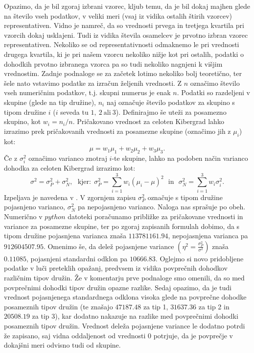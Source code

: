 \documentclass{article}
\begin{document}
Opazimo, da je bil zgoraj izbrani vzorec, kljub temu, da je bil dokaj majhen glede na število vseh podatkov, v veliki meri (vsaj iz vidika ostalih štirih vzorcev) representativen.
Vidno je namreč, da so vrednosti prvega in tretjega kvartila pri vzorcih dokaj usklajeni. 
Tudi iz vidika števila osamelcev je prvotno izbran vzorec representativen. 
Nekoliko se od representativnosti odmaknemo le pri vrednosti drugega kvartila, ki je pri našem vzorcu nekoliko nižje kot pri ostalih, podatki o dohodkih prvotno izbranega vzorca pa so tudi nekoliko nagnjeni k višjim vrednostim.
\newline
\newline
Zadnje podnaloge se za začetek lotimo nekoliko bolj teoretično, ter šele nato vstavimo podatke za izračun željenih vrednosti. 
Z $n$ označimo število vseh numeričnim podatkov, t.j. skupni numerus je enak $n$. Podatki so razdeljeni v skupine (glede na tip družine), $n_i$ naj označuje število podatkov za skupino s tipom družine $i$ ($i$ seveda tu $1,~2~\text{ali}~3$).
Definirajmo še uteži za posamezno skupino, kot $w_i = n_i/n$.
\newline
Pričakovano vrednost za celoten Kibergrad lahko izrazimo prek pričakovanih vrednosti za posamezne skupine (označimo jih z $\mu_i$) kot:
$$
    \mu = w_1 \mu_1 + w_2 \mu_2 + w_3 \mu_3.
$$
Če z $\sigma_{i}^2$ označimo varianco znotraj $i$-te skupine, lahko na podoben način varianco dohodka za celoten Kibergrad izrazimo kot:
$$
\sigma^2 = \sigma_{P}^2 + \sigma_{N}^2,~~~\text{kjer:}~~\sigma_{P}^2 = \sum_{i=1}^{3}{w_i(\mu_i - \mu)^2}~~~\text{in}~~~\sigma_{N}^2 = \sum_{i=1}^{3}{w_i \sigma_{i}^2}.
$$
Izpeljava je navedena v \cite{poj_nepo_var}. V zgornjem zapisu $\sigma_P^2$ označuje s tipom družine pojasnjeno varianco, $\sigma_N^2$ pa nepojasnjeno varianco. Naloga nas sprašuje po obeh. 
\newline
Numerično v $python$ datoteki poračunamo približke za pričakovane vrednosti in variance za posamezne skupine, ter po zgoraj zapisanih formulah dobimo, 
da s tipom družine pojasnjena varianca znaša $113781161.94$, nepojasnjena varianca pa $912604507.95$. Omenimo še, da delež pojasnjene variance $\left(\eta^2 = \frac{\sigma_{P}^2}{\sigma^2}\right)$ znaša $0.11085$, pojasnjeni standardni odklon pa $10666.83$.
\newline
\newline
Oglejmo si novo pridobljene podatke v luči preteklih opažanj, predvsem iz vidika povprečnih dohodkov različnim tipov družin. Že v komentarju prve podnaloge smo omenili, da so med povprečnimi dohodki tipov družin opazne razlike.  
Sedaj opazimo, da je tudi vrednost pojasnjenega standardnega odklona visoka glede na povprečne dohodke posameznih tipov družin (te znašajo $47187.48$ za tip 1, $31637.36$ za tip 2 in $20508.19$ za tip 3), kar dodatno nakazuje na razlike med povprečnimi dohodki posameznih tipov družin.
Vrednost deleža pojasnjene variance le dodatno potrdi že zapisano, saj vidna oddaljenost od vrednosti $0$ potrjuje, da je povprečje v dokajšni meri odvisno tudi od skupine.
\end{document}
